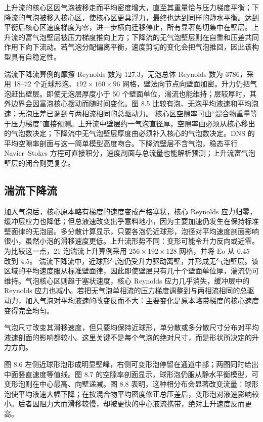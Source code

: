\documentclass[11pt,a4paper,openany,fontset=none]{ctexbook}
\begin{document}
上升流的核心区因气泡被移走而平均密度增大，直至其重量恰与压力梯度平衡；下降流的气泡被移入核心区，使核心区更具浮力，最终也达到同样的静水平衡。达到平衡后核心区速度梯度为零，进一步横向迁移停止，所有显著剪切集中在壁层。上升流的富气泡壁层被压力梯度推向上方；下降流的无气泡壁层则在自重和压差共同作用下向下流动。若气泡分配偏离平衡，速度剪切的变化会把气泡推回，因此该构型具有自稳定性。

湍流下降流算例的摩擦 Reynolds 数为 $127.3$，无泡总体 Reynolds 数为 $3786$，采用 18--72 个近球形泡、$192\times160\times96$ 网格，壁法向节点向壁面加密。升力仍把气泡赶出壁层。即使无泡层厚度小于 50 个壁面单位，湍流也能维持；层较厚时，其外边界会因富泡核心摆动而随时间变化。图 8.5 比较有泡、无泡平均液速和平均泡速；无泡压差已调到与两相流相同的总驱动力。
核心区空隙率可由“混合物重量等于压力梯度”直接预测。上升流中壁层约一气泡直径厚，空隙率由必须从核心移出的气泡数决定；下降流中无气泡壁层厚度由必须补入核心的气泡数决定。DNS 的平均空隙率剖面与这一简单模型高度吻合。下降流壁层不含气泡，稳态平行 Navier--Stokes 方程可直接积分，速度剖面与总流量也能解析预测；上升流富气泡壁层的闭合则更复杂。

\subsection{湍流下降流}

加入气泡后，核心原本略有梯度的速度变成严格塞状，核心 Reynolds 应力归零，缓冲层应力也降低；但总液速改变出乎意料地小，因为主要加速仍发生在保持标准壁面律的无泡层。多分散计算显示，只要各泡仍近球形，泡径对平均速度剖面影响很小，虽然小泡的滑移速度更低。上升流形势不同：变形可能令升力反向或近零。为比较这一点，21 泡湍流上升算例采用 $256\times192\times128$ 网格，并将 $\mathrm{Eo}$ 从 $0.45$ 改到 $4.5$。
湍流下降流中，近球形气泡仍受升力驱动离壁，并形成无气泡壁层。该区域的平均速度服从标准壁面律，因此即使壁层只有几十个壁面单位厚，湍流仍可维持。气泡核心区则趋于塞状速度，核心 Reynolds 应力几乎消失，缓冲层中的 Reynolds 应力也减小。若把无气泡单相流的压力梯度调整到与两相流相同的总驱动力，加入气泡对平均液速的改变反而不大：主要变化是原本略带梯度的核心速度变得完全均匀。

气泡尺寸改变其滑移速度，但只要均保持近球形，单分散或多分散尺寸分布对平均液速剖面的影响都较小。这里关键不是每个气泡的绝对尺寸，而是形状所决定的升力方向。

图 8.6 左侧近球形泡形成明显壁峰，右侧可变形泡停留在通道中部；两图同时给出中面竖直速度等值线。图 8.7 的空隙率剖面显示，球形泡仍服从静水平衡模型，可变形泡则在中心最高、向壁递减。图 8.8 表明，这种相分布会显著改变流量：球形泡使平均液速大幅下降；在按混合物平均密度修正总压差后，变形泡对液速影响较小。后者因阻力大而滑移较慢，却被更快的中心液流携带，绝对上升速度反而更高。
\end{document}
